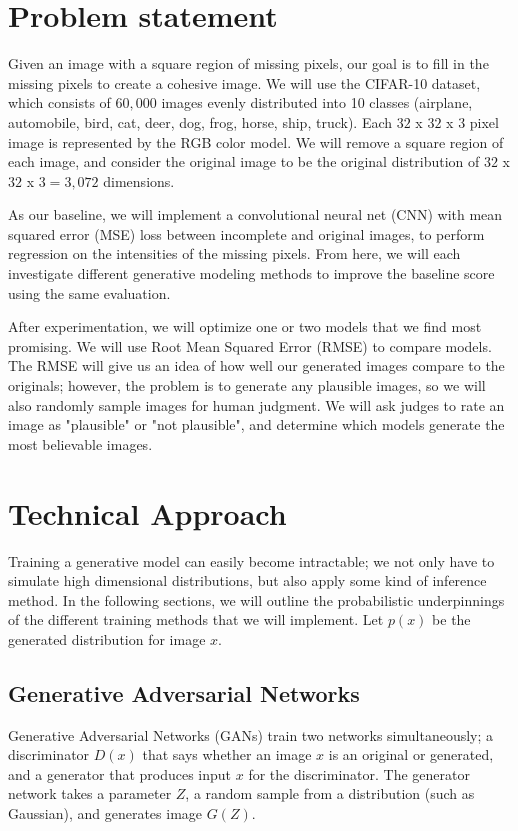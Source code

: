 \documentclass[10pt,twocolumn,letterpaper]{article}
\begin{document}
\section{Problem statement}
Given an image with a square region of missing pixels, our goal is to fill in the missing pixels to create a cohesive image. We will use the CIFAR-10 dataset, which consists of $60,000$ images evenly distributed into 10 classes (airplane, automobile, bird, cat, deer, dog, frog, horse, ship, truck). Each $32$ x $32$ x $3$ pixel image is represented by the RGB color model. We will remove a square region of each image, and consider the original image to be the original distribution of $32$ x $32$ x $3 = 3,072$ dimensions. 

\par As our baseline, we will implement a convolutional neural net (CNN) with mean squared error (MSE) loss between incomplete and original images, to perform regression on the intensities of the missing pixels. From here, we will each investigate different generative modeling methods to improve the baseline score using the same evaluation.

\par After experimentation, we will optimize one or two models that we find most promising. We will use Root Mean Squared Error (RMSE) to compare models. The RMSE will give us an idea of how well our generated images compare to the originals; however, the problem is to generate any plausible images, so we will also randomly sample images for human judgment. We will ask judges to rate an image as "plausible" or "not plausible", and determine which models generate the most believable images. 


\section{Technical Approach}
Training a generative model can easily become intractable; we not only have to simulate high dimensional distributions, but also apply some kind of inference method. In the following sections, we will outline the probabilistic underpinnings of the different training methods that we will implement. Let $p(x)$ be the generated distribution for image $x$.

\subsection{Generative Adversarial Networks}
Generative Adversarial Networks (GANs) train two networks simultaneously; a discriminator $D(x)$ that says whether an image $x$ is an original or generated, and a generator that produces input $x$ for the discriminator. The generator network takes a parameter $Z$, a random sample from a distribution (such as Gaussian), and generates image $G(Z)$.
\end{document}
